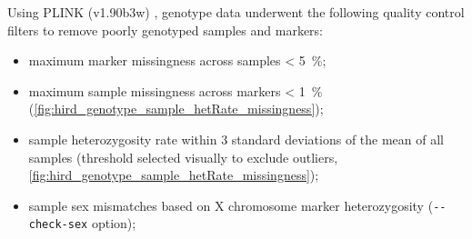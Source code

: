 Using PLINK (v1.90b3w) \autocite{chang2015SecondgenerationPLINKRising}, genotype data underwent the following quality control filters to remove poorly genotyped samples and markers:
\begin{itemize}
    \item maximum marker missingness across samples \SI{< 5}{\percent};
    \item maximum sample missingness across markers \SI{< 1}{\percent} (\cref{fig:hird_genotype_sample_hetRate_missingness});
    \item sample heterozygosity rate within 3 standard deviations of the mean of all samples (threshold selected visually to exclude outliers, \cref{fig:hird_genotype_sample_hetRate_missingness});
    \item sample sex mismatches based on X chromosome marker heterozygosity (\texttt{-{}-check-sex} option);

\end{itemize}
